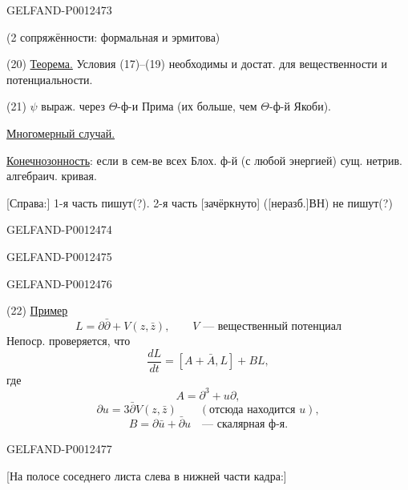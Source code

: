 \begin{GelfandAdjacentEvidence}{GELFAND-P001247}{3}


(2 сопряжённости: формальная и эрмитова)

(20) \underline{Теорема.} Условия (17)--(19) необходимы и достат. для вещественности и потенциальности.

(21) $\psi$ выраж. через $\Theta$-ф-и Прима (их больше, чем $\Theta$-ф-й Якоби).

\underline{Многомерный случай.}

\underline{Конечнозонность}: если в сем-ве всех Блох. ф-й (с любой энергией) сущ. нетрив. алгебраич. кривая.

[Справа:] 1-я часть пишут(?). 2-я часть [зачёркнуто] ([неразб.]ВН) не пишут(?)
\end{GelfandAdjacentEvidence}
\begin{GelfandAdjacentEvidence}{GELFAND-P001247}{4}

\end{GelfandAdjacentEvidence}
\begin{GelfandAdjacentEvidence}{GELFAND-P001247}{5}

\end{GelfandAdjacentEvidence}
\begin{GelfandAdjacentEvidence}{GELFAND-P001247}{6}


(22) \underline{Пример}
\begin{equation*}
L=\partial\bar\partial+V(z,\bar z),\qquad V\text{ — вещественный потенциал}
\end{equation*}
Непоср. проверяется, что
\begin{equation*}
\frac{dL}{dt}=[A+\bar A,L]+BL,
\end{equation*}
где
\begin{equation*}
A=\partial^3+u\partial,
\end{equation*}
\begin{equation*}
\partial u=3\bar\partial V(z,\bar z)\qquad(\text{отсюда находится }u),
\end{equation*}
\begin{equation*}
B=\partial\bar u+\bar\partial u\quad\text{— скалярная ф-я}.
\end{equation*}
\end{GelfandAdjacentEvidence}
\begin{GelfandAdjacentEvidence}{GELFAND-P001247}{7}


[На полосе соседнего листа слева в нижней части кадра:]
\end{GelfandAdjacentEvidence}



